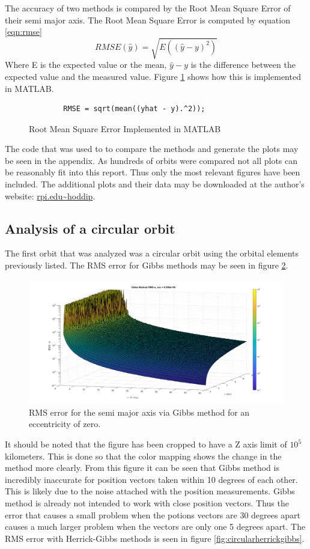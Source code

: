 \documentclass[12pt]{article}
\begin{document}
	The accuracy of two methods is compared by the Root Mean Square Error of their semi major axis. The Root Mean Square Error is computed by equation \ref{eqn:rmse}
	\begin{equation}
	RMSE(\hat{y})=\sqrt{E\left(\left(\hat{y}-y\right)^2\right)}
	\label{eqn:rmse}
	\end{equation}
	Where E is the expected value or the mean, $\hat{y}-y$ is the difference between the expected value and the measured value. 
	Figure \ref{fig:RMS_MATLAB} shows how this is implemented in MATLAB. 
		\begin{figure}[H]
		\begin{lstlisting}
		RMSE = sqrt(mean((yhat - y).^2));
		\end{lstlisting}
		\caption{Root Mean Square Error Implemented in MATLAB}
		\label{fig:RMS_MATLAB}
	\end{figure}
	
	The code that was used to to compare the methods and generate the plots may be seen in the appendix. As hundreds of orbits were compared not all plots can be reasonably fit into this report. Thus only the most relevant figures have been included. The additional plots and their data may be downloaded at the author's website: \url{rpi.edu\~hoddip}.
	\subsection{Analysis of a circular orbit}
	The first orbit that was analyzed was a circular orbit using the orbital elements previously listed. The RMS error for Gibbs methods may be seen in figure \ref{fig:circulargibbs}.
	\begin{figure}[H]
		\centering
		\includegraphics[width=0.7\linewidth]{circularGibbs}
		\caption{RMS error for the semi major axis via Gibbs method for an eccentricity of zero.}
		\label{fig:circulargibbs}
	\end{figure}
		It should be noted that the figure has been cropped to have a Z axis limit of $10^5$ kilometers. This is done so that the color mapping shows the change in the method more clearly. From this figure it can be seen that Gibbs method is incredibly inaccurate for position vectors taken within 10 degrees of each other. This is likely due to the noise attached with the position measurements. Gibbs method is already not intended to work with close position vectors. Thus the error that causes a small problem when the potions vectors are 30 degrees apart causes a much larger problem when the vectors are only one 5 degrees apart. The RMS error with Herrick-Gibbs methods is seen in figure \ref{fig:circularherrickgibbs}.
		
\end{document}
